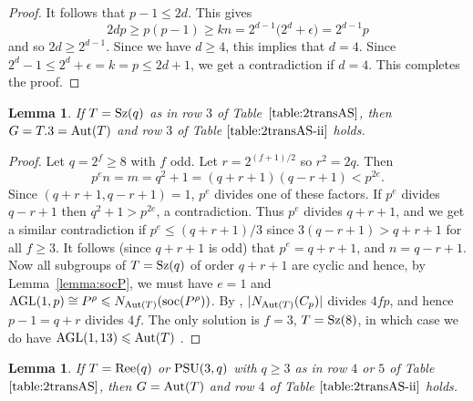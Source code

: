 \documentclass[12pt]{amsart}
\newtheorem{lem}[thm]{Lemma}
\theoremstyle{remark}
\theoremstyle{definition}
\newcounter{claim}[thm]
\newcommand{\soc}{\mathrm{soc}}
\newcommand{\GL}{\mathrm{GL}}
\newcommand{\AGL}{\mathrm{AGL}}
\newcommand{\PSU}{\textnormal{PSU}}
\newcommand{\Ree}{\textnormal{Ree}}
\newcommand{\Sz}{\textnormal{Sz}}
\newcommand{\aut}{\textnormal{Aut}}
\begin{document}
\begin{proof}

It follows that $p - 1 \leqslant 2d$. This gives
	\[ 2dp \geqslant p(p-1) \geqslant kn = 2^{d-1}\big(2^d + \epsilon) = 2^{d-1}p \]
and so $2d \geqslant 2^{d-1}$. Since we have $d\geqslant 4$, this implies that $d = 4$. Since $2^d - 1 \leqslant 2^d + \epsilon = k = p \leqslant 2d + 1$, we get a contradiction if $d=4$. This completes the proof.
\end{proof}

\begin{lem}
\label{lem:2-trans sz}
If $T = \Sz(q)$ as in row $3$ of Table~$\ref{table:2transAS}$, then $G = T.3 = \aut(T)$ and row $3$ of Table $\ref{table:2transAS-ii}$ holds.
\end{lem}

\begin{proof}
Let $q = 2^f \geqslant 8$ with $f$ odd. Let $r = 2^{(f+1)/2}$ so $r^2 = 2q$. Then 
	\[ p^e n = m = q^2 + 1 = (q+r+1)(q-r+1) < p^{2e}. \]
Since $(q+r+1, q-r+1)=1$, $p^e$ divides one of these factors. If $p^e$ divides $q-r+1$ then $q^2+1 > p^{2e}$, a contradiction. 
Thus $p^e$ divides $q+r+1$, and we get a similar contradiction if $p^e \leqslant (q+r+1)/3$ since $3(q-r+1) > q+r+1$ for all $f \geqslant 3$. 
It follows (since $q+r+1$ is odd) that $p^e = q+r+1$, and $n = q-r+1$. Now all subgroups of $T = \Sz(q)$ of order $q+r+1$ are cyclic \cite[Section 4]{sz} 
 and hence, by Lemma~\ref{lemma:socP}, we must have $e = 1$ and $\AGL(1,p) \cong P^\rho\leqslant N_{\aut(T)}(\soc(P^\rho))$. By \cite{sz}, $|N_{\aut(T)}(C_p)| $ divides $ 4fp$, and hence $p-1 = q+r$ divides $4f$. The only solution is $f = 3$, $T = \Sz(8)$, in which case we do have $\AGL(1,13) \leqslant \aut(T)$ \cite[p.28]{atlas}. 
\end{proof}

\begin{lem}\label{lemma 2-trans Ree PSU}
If $T = \Ree(q)$ or $\PSU(3,q)$ with $q \geqslant 3$ as in row $4$ or $5$ of Table~$\ref{table:2transAS}$, then $G = \aut(T)$ and row $4$ of 
Table $\ref{table:2transAS-ii}$ holds.
\end{lem}
\end{document}
